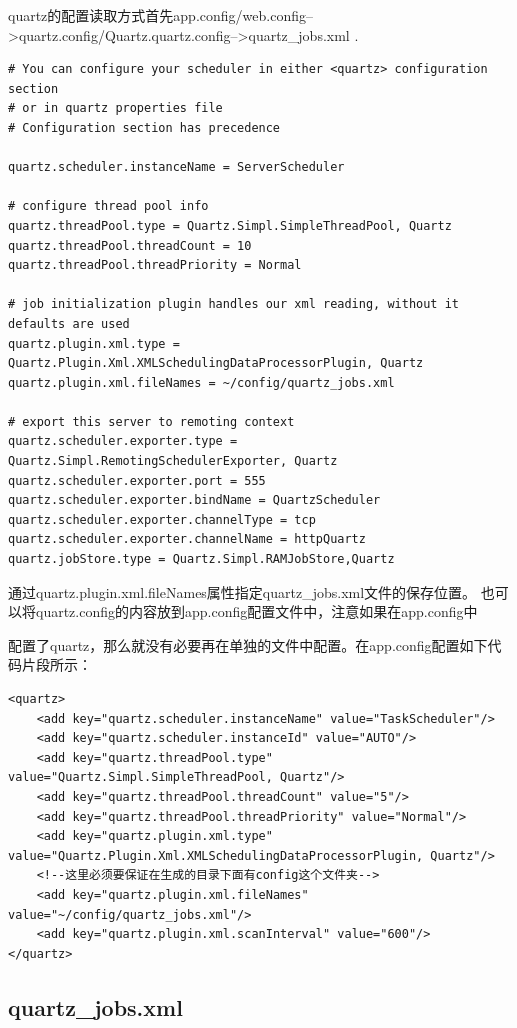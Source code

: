 \documentclass{book}
\begin{document}
quartz的配置读取方式首先app.config/web.config-->quartz.config/Quartz.quartz.config-->quartz\_jobs.xml .

\begin{lstlisting}
# You can configure your scheduler in either <quartz> configuration section  
# or in quartz properties file  
# Configuration section has precedence  

quartz.scheduler.instanceName = ServerScheduler  

# configure thread pool info  
quartz.threadPool.type = Quartz.Simpl.SimpleThreadPool, Quartz  
quartz.threadPool.threadCount = 10  
quartz.threadPool.threadPriority = Normal  

# job initialization plugin handles our xml reading, without it defaults are used  
quartz.plugin.xml.type = Quartz.Plugin.Xml.XMLSchedulingDataProcessorPlugin, Quartz  
quartz.plugin.xml.fileNames = ~/config/quartz_jobs.xml  

# export this server to remoting context  
quartz.scheduler.exporter.type = Quartz.Simpl.RemotingSchedulerExporter, Quartz  
quartz.scheduler.exporter.port = 555  
quartz.scheduler.exporter.bindName = QuartzScheduler  
quartz.scheduler.exporter.channelType = tcp  
quartz.scheduler.exporter.channelName = httpQuartz 
quartz.jobStore.type = Quartz.Simpl.RAMJobStore,Quartz
\end{lstlisting}

通过quartz.plugin.xml.fileNames属性指定quartz\_jobs.xml文件的保存位置。
也可以将quartz.config的内容放到app.config配置文件中，注意如果在app.config中

配置了quartz，那么就没有必要再在单独的文件中配置。在app.config配置如下代码片段所示：
\begin{lstlisting}
<quartz>
	<add key="quartz.scheduler.instanceName" value="TaskScheduler"/>
	<add key="quartz.scheduler.instanceId" value="AUTO"/>
	<add key="quartz.threadPool.type" value="Quartz.Simpl.SimpleThreadPool, Quartz"/>
	<add key="quartz.threadPool.threadCount" value="5"/>
	<add key="quartz.threadPool.threadPriority" value="Normal"/>
	<add key="quartz.plugin.xml.type" value="Quartz.Plugin.Xml.XMLSchedulingDataProcessorPlugin, Quartz"/>
	<!--这里必须要保证在生成的目录下面有config这个文件夹-->
	<add key="quartz.plugin.xml.fileNames" value="~/config/quartz_jobs.xml"/>
	<add key="quartz.plugin.xml.scanInterval" value="600"/>   
</quartz>
\end{lstlisting}

\subsection{quartz\_jobs.xml}
\end{document}
